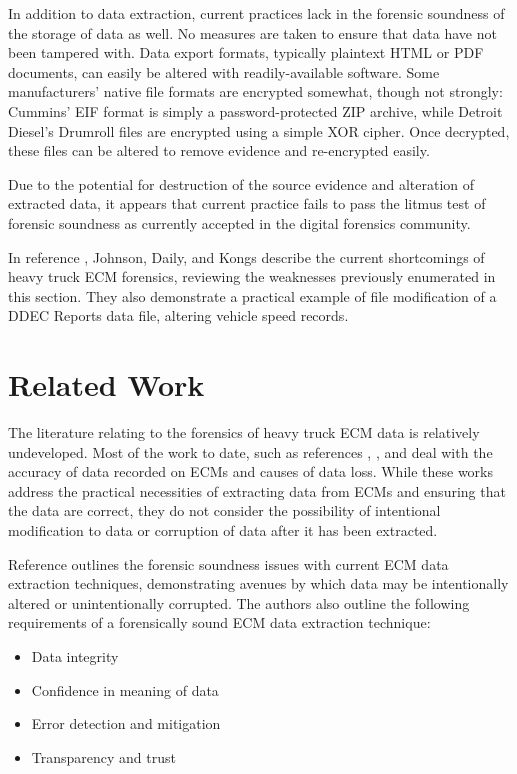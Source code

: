 In addition to data extraction, current practices lack in the forensic soundness of the storage of data as well. No measures are taken to ensure that data have not been tampered
with. Data export formats, typically plaintext HTML or PDF documents, can easily be altered with readily-available software. Some manufacturers' native file formats are encrypted
somewhat, though not strongly: Cummins' EIF format is simply a password-protected ZIP archive, while Detroit Diesel's Drumroll files are encrypted using a simple XOR cipher.
Once decrypted, these files can be altered to remove evidence and re-encrypted easily.

Due to the potential for destruction of the source evidence and alteration of extracted data, it appears that current practice fails to pass the litmus test of forensic soundness
as currently accepted in the digital forensics community.

In reference \cite{Johnson2014}, Johnson, Daily, and Kongs describe the current shortcomings of heavy truck ECM forensics, reviewing the weaknesses previously enumerated in this section. They also
demonstrate a practical example of file modification of a DDEC Reports data file, altering vehicle speed records.

\section{Related Work}

The literature relating to the forensics of heavy truck ECM data is relatively undeveloped. Most of the work to date, such as references \cite{reust2004}, \cite{steiner2013}, and \cite{austin2011} deal
with the accuracy of data recorded on ECMs and causes of data loss. While these works address the practical necessities of extracting data from ECMs and ensuring that the data are
correct, they do not consider the possibility of intentional modification to data or corruption of data after it has been extracted.

Reference \cite{Johnson2014} outlines the forensic soundness issues with current ECM data extraction techniques, demonstrating avenues by which data may be intentionally altered
or unintentionally corrupted. The authors also outline the following requirements of a forensically sound ECM data extraction technique:

\begin{itemize}
  \item Data integrity
  \item Confidence in meaning of data
  \item Error detection and mitigation
  \item Transparency and trust
\end{itemize}

